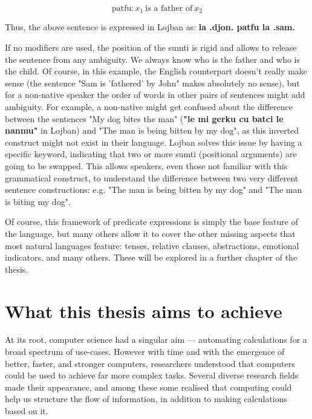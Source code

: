 $$\text{patfu}: x_1 \: \text{is a father of} \: x_2$$

Thus, the above sentence is expressed in Lojban as: \textbf{la .djon. patfu la .sam.} \newline

If no modifiers are used, the position of the sumti is rigid and allows to release the sentence from any ambiguity. We always know who is the father and who is the child.
Of course, in this example, the English counterpart doesn't really make sense (the sentence "Sam is 'fathered' by John" makes absolutely no sense), but for a non-native speaker
the order of words in other pairs of sentences might add ambiguity. For example, a non-native might get confused about the difference between the sentences
"My dog bites the man" (\textbf{"le mi gerku cu batci le nanmu"} in Lojban) and "The man is being bitten by my dog", as this inverted construct might not exist in their language.
Lojban solves this issue by having a specific keyword, indicating that two or more sumti (positional arguments) are going to be swapped. This allows speakers, even those not
familiar with this grammatical construct, to understand the difference between two very different sentence constructions: e.g. "The man is being bitten by my dog"
and "The man is biting my dog".\newline

Of course, this framework of predicate expressions is simply the base feature of the language, but many others allow it to cover the other missing aspects that most natural
languages feature: tenses, relative clauses, abstractions, emotional indicators, and many others. These will be explored in a further chapter of the thesis. \newline

\section{What this thesis aims to achieve}

At its root, computer science had a singular aim --- automating calculations for a broad spectrum of use-cases. However with time and with the emergence of better, faster, and
stronger computers, researchers understood that computers could be used to achieve far more complex tasks. Several diverse research fields made their appearance, and among these
some realised that computing could help us structure the flow of information, in addition to making calculations based on it. \newline

